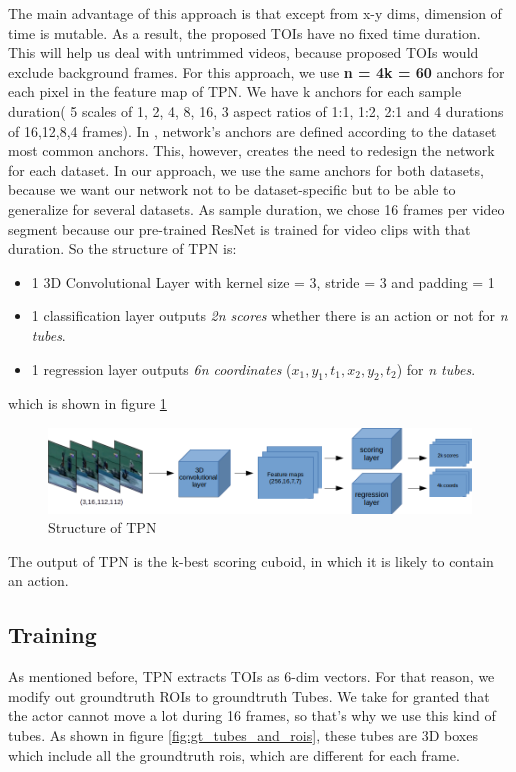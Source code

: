 \documentclass{report}
\begin{document}
The main advantage of this approach is that except from x-y dims, dimension of time is mutable. As a result, the proposed TOIs have
no fixed time duration. This will help us deal with untrimmed videos, because proposed TOIs would exclude background frames.
For this approach, we use \textbf{n = 4k = 60} anchors for each pixel in the feature map of TPN. We have k anchors for each sample
duration( 5 scales of 1, 2, 4, 8, 16, 3 aspect ratios of 1:1, 1:2, 2:1 and 4 durations of 16,12,8,4 frames).
In \cite{DBLP:journals/corr/HouCS17},  network's anchors are defined according to the dataset most common anchors. This, however,
creates the need to redesign the network for each dataset. In our approach, we use the same anchors for both datasets, because we want our network not
to be dataset-specific but to be able to generalize for several datasets. As sample duration, we chose 16 frames per video segment because
our pre-trained ResNet is trained for video clips with that duration.
So the structure of TPN is:
\begin{itemize}
\item 1 3D Convolutional Layer with kernel size = 3, stride = 3 and padding = 1
\item 1 classification layer outputs \textit{2n scores} whether there is an action or not for \textit{n tubes}.
\item 1 regression layer outputs \textit{6n coordinates} ($x_1,y_1,t_1,x_2,y_2,t_2$) for \textit{n tubes}.
\end{itemize}

which is shown in figure \ref{fig:tpn_1_1}
\begin{figure}[h]

  \includegraphics[width=1.\textwidth]{tpn_1_1}
  \caption{Structure of TPN}
  \label{fig:tpn_1_1}
\end{figure}

The output of TPN is the k-best scoring cuboid, in which it is likely to contain an action.


\subsection{Training}
As mentioned before, TPN extracts TOIs as 6-dim vectors. For that reason, we modify out groundtruth ROIs to groundtruth Tubes.
We take for granted that the actor cannot move a lot during 16 frames, so that's why we use this kind of tubes. As shown 
in figure \ref{fig:gt_tubes_and_rois}, these tubes are 3D boxes which include all the groundtruth rois, which are different
for each frame.
\end{document}
